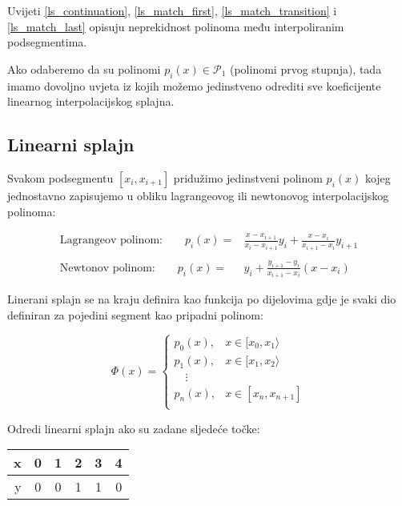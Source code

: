 Uvijeti \ref{ls_continuation}, \ref{ls_match_first}, \ref{ls_match_transition} i \ref{ls_match_last} opisuju neprekidnost polinoma među interpoliranim podsegmentima.

Ako odaberemo da su polinomi $p_i(x)\in\mathcal{P}_1$ (polinomi prvog stupnja), tada imamo dovoljno uvjeta iz kojih možemo jedinstveno odrediti sve koeficijente linearnog interpolacijskog splajna.

\subsection{Linearni splajn}

Svakom podsegmentu $[x_i,x_{i+1}]$ pridužimo jedinstveni polinom $p_i(x)$ kojeg jednostavno zapisujemo u obliku lagrangeovog ili newtonovog interpolacijskog polinoma:

\begin{align*}
\text{Lagrangeov polinom:}\qquad p_i(x) =& \frac{x-x_{i+1}}{x_i-x_{i+1}}y_i + \frac{x-x_i}{x_{i+1}-x_i}y_{i+1}\\\\
\text{Newtonov polinom:}\qquad p_i(x) =& y_i + \frac{y_{i+1}-y_i}{x_{i+1}-x_i}(x-x_i)
\end{align*}

Linerani splajn se na kraju definira kao funkcija po dijelovima gdje je svaki dio definiran za pojedini segment kao pripadni polinom:

\begin{equation}
    \Phi(x)=\begin{cases}
        p_0(x),&x\in[x_0,x_1\rangle\\
        p_1(x),&x\in[x_1,x_2\rangle\\
        \quad\vdots&\\
        p_n(x),&x\in[x_n,x_{n+1}]\\
    \end{cases}
\end{equation}

\newpage

\begin{examplebox}
    Odredi linearni splajn ako su zadane sljedeće točke:

    \center
    \begin{tabular}{r|c|c|c|c|c}
        x&0&1&2&3&4\\
        \hline
        y&0&0&1&1&0
    \end{tabular}
\end{examplebox}

